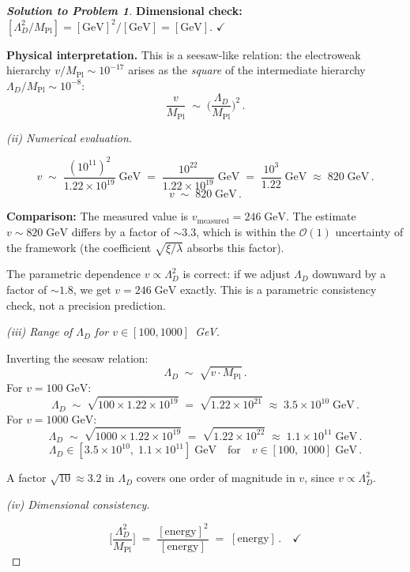 \documentclass[11pt,a4paper]{article}
\begin{document}
\begin{proof}[\textbf{Solution to Problem 1}]
\textbf{Dimensional check:}
$[\Lambda_D^2/M_{\text{Pl}}] = [\text{GeV}]^2 / [\text{GeV}]
= [\text{GeV}]$.
\quad$\checkmark$

\textbf{Physical interpretation.}  This is a seesaw-like relation: the
electroweak hierarchy $v/M_{\text{Pl}} \sim 10^{-17}$ arises as the
\emph{square} of the intermediate hierarchy
$\Lambda_D/M_{\text{Pl}} \sim 10^{-8}$:
\[
  \frac{v}{M_{\text{Pl}}}
  \;\sim\; \biggl(\frac{\Lambda_D}{M_{\text{Pl}}}\biggr)^{\!2}\,.
\]

\textit{(ii) Numerical evaluation.}

\[
  v \;\sim\; \frac{(10^{11})^2}{1.22 \times 10^{19}}\;\text{GeV}
  \;=\; \frac{10^{22}}{1.22 \times 10^{19}}\;\text{GeV}
  \;=\; \frac{10^{3}}{1.22}\;\text{GeV}
  \;\approx\; 820\;\text{GeV}\,.
\]
\[
  \boxed{v \;\sim\; 820\;\text{GeV}\,.}
\]

\textbf{Comparison:} The measured value is
$v_{\text{measured}} = 246\;\text{GeV}$.  The estimate
$v \sim 820\;\text{GeV}$ differs by a factor of $\sim 3.3$,
which is within the $\mathcal{O}(1)$ uncertainty of the framework
(the coefficient $\sqrt{\xi/\lambda}$ absorbs this factor).

The parametric dependence $v \propto \Lambda_D^2$ is correct: if we
adjust $\Lambda_D$ downward by a factor of $\sim 1.8$, we get
$v = 246\;\text{GeV}$ exactly.  This is a parametric consistency
check, not a precision prediction.

\textit{(iii) Range of $\Lambda_D$ for $v \in [100, 1000]$~GeV.}

Inverting the seesaw relation:
\[
  \Lambda_D \;\sim\; \sqrt{v \cdot M_{\text{Pl}}}\,.
\]
For $v = 100\;\text{GeV}$:
\[
  \Lambda_D \;\sim\; \sqrt{100 \times 1.22 \times 10^{19}}
  \;=\; \sqrt{1.22 \times 10^{21}}
  \;\approx\; 3.5 \times 10^{10}\;\text{GeV}\,.
\]
For $v = 1000\;\text{GeV}$:
\[
  \Lambda_D \;\sim\; \sqrt{1000 \times 1.22 \times 10^{19}}
  \;=\; \sqrt{1.22 \times 10^{22}}
  \;\approx\; 1.1 \times 10^{11}\;\text{GeV}\,.
\]
\[
  \boxed{\Lambda_D \in
  [3.5 \times 10^{10},\; 1.1 \times 10^{11}]\;\text{GeV}
  \quad\text{for}\quad
  v \in [100,\; 1000]\;\text{GeV}\,.}
\]

A factor $\sqrt{10} \approx 3.2$ in $\Lambda_D$ covers one order of
magnitude in $v$, since $v \propto \Lambda_D^2$.

\textit{(iv) Dimensional consistency.}

\[
  \biggl[\frac{\Lambda_D^2}{M_{\text{Pl}}}\biggr]
  \;=\; \frac{[\text{energy}]^2}{[\text{energy}]}
  \;=\; [\text{energy}]\,.
  \quad\checkmark
\]


\end{proof}
\end{document}
